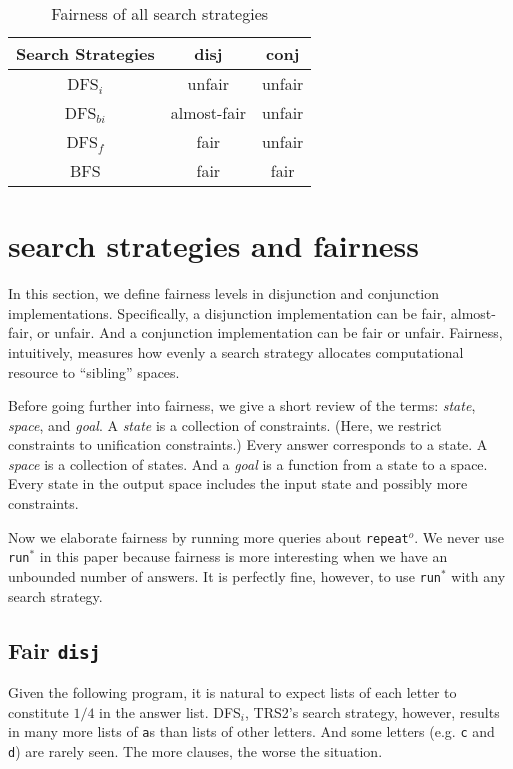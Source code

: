 \documentclass[format=acmlarge, review=false, authordraft=false]{acmart}
\newcommand{\conj}{\texttt{conj}}
\newcommand{\disj}{\texttt{disj}}
\newcommand{\repeato}{\texttt{repeat$^o$}}
\newcommand{\runstar}{\texttt{run$^*$}}
\newcommand{\DFSi }[0]{DFS$_{i}$}
\newcommand{\DFSf }[0]{DFS$_{f}$}
\newcommand{\DFSbi}[0]{DFS$_{bi}$}
\newcommand{\BFS}[0]{BFS}
\begin{document}
\begin{table}[h]
	\begin{tabular}{|c|c|c|}
		\hline 
		Search Strategies & disj & conj \\ 
		\hline 
		\DFSi & unfair & unfair \\ 
		\hline 
		\DFSbi & almost-fair & unfair \\ 
		\hline 
		\DFSf & fair & unfair \\ 
		\hline 
		\BFS & fair & fair \\ 
		\hline 
	\end{tabular} 
	\caption{Fairness of all search strategies}
	\label{table-fairness}
\end{table}

\section{search strategies and fairness}

In this section, we define fairness levels in disjunction and conjunction
implementations. Specifically, a disjunction implementation can be
fair, almost-fair, or unfair. And a conjunction implementation can be
fair or unfair. Fairness, intuitively, measures how evenly a search strategy 
allocates computational resource to ``sibling'' spaces.

Before going further into fairness, we give a short review of the terms:
\emph{state}, \emph{space}, and \emph{goal}.
A \emph{state} is a collection of constraints. (Here, we restrict 
constraints to unification constraints.) Every answer corresponds to a 
state. A \emph{space} is a collection of states. And a \emph{goal} is a 
function from a state to a space.
Every state in the output space includes the input state and possibly more 
constraints.

Now we elaborate fairness by running more queries about \repeato{}. We never 
use \runstar{} in this paper because fairness is more interesting when we 
have an unbounded number of answers. It is perfectly fine, however, to use 
\runstar{} with any search strategy.

\subsection{Fair \texttt{disj}}

Given the following program, it is natural to expect lists of each
letter to constitute $1/4$ in the answer list. \DFSi, TRS2's search
strategy, however, results in many more lists of \texttt{a}s than
lists of other letters. And some letters (e.g. \texttt{c} and
\texttt{d}) are rarely seen. The more clauses, the worse the situation.
\end{document}
